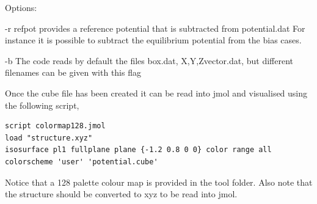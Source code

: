 Options:

 -r  refpot provides a reference potential that is subtracted from potential.dat
     For instance it is possible to subtract the equilibrium potential from the
     bias cases.
 
 -b  The code reads by default the files box.dat, X,Y,Zvector.dat, but 
     different filenames can be given with this flag

Once the cube file has been created it can be read into jmol and visualised
using the following script,
\begin{verbatim}
script colormap128.jmol
load "structure.xyz"
isosurface pl1 fullplane plane {-1.2 0.8 0 0} color range all colorscheme 'user' 'potential.cube'
\end{verbatim}

Notice that a 128 palette colour map is provided in the tool folder. Also note
that the structure should be converted to xyz to be read into jmol.


